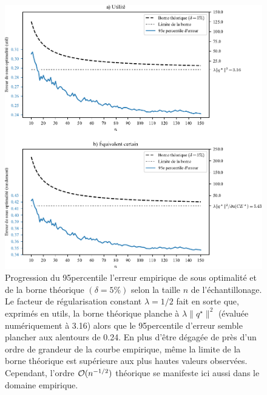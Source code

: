 \begin{figure}[h!]
  \centering
  \includegraphics[width=1.3\textwidth]{../experiments/fig/bound_errso.pdf}
  \caption{Progression du 95\ieme percentile l'erreur empirique de sous optimalité et de
    la borne théorique $(\delta = 5\%)$ selon la taille $n$ de l'échantillonage. Le facteur de
    régularisation constant $\lambda = 1/2$ fait en sorte que, exprimés en utils, la borne
    théorique planche à $\lambda\|q^\star\|^2$ (évaluée numériquement à \num{3.16}) alors que le
    95\ieme percentile d'erreur semble plancher aux alentours de \num{0.24}. En plus
    d'être dégagée de près d'un ordre de grandeur de la courbe empirique, même la limite
    de la borne théorique est supérieure aux plus hautes valeurs observées. Cependant,
    l'ordre $\mathcal O(n^{-1/2})$ théorique se manifeste ici aussi dans le domaine empirique.}
  \label{fig_bound_errso}
\end{figure}

